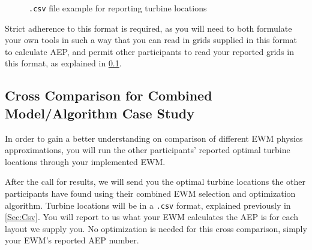 \documentclass[12pt]{article}
\begin{document}
    \begin{figure}[H]
    \centering
    \caption{\texttt{.csv} file example for reporting turbine locations}
    \label{code:locations}
    \end{figure}
    
    Strict adherence to this format is required, as you will need to both formulate your own tools in such a way that you can read in grids supplied in this format to calculate AEP, and permit other participants to read your reported grids in this format, as explained in \cref{Sec:CrossComp}. 
    
    \subsection{Cross Comparison for Combined Model/Algorithm Case Study}\label{Sec:CrossComp}
    In order to gain a better understanding on comparison of different EWM physics approximations, you will run the other participants' reported optimal turbine locations through your implemented EWM.
    
    After the call for results, we will send you the optimal turbine locations the other participants have found using their combined EWM selection and optimization algorithm. Turbine locations will be in a \texttt{.csv} format, explained previously in \cref{Sec:Csv}. You will report to us what your EWM calculates the AEP is for each layout we supply you. No optimization is needed for this cross comparison, simply your EWM's reported AEP number.
\end{document}
